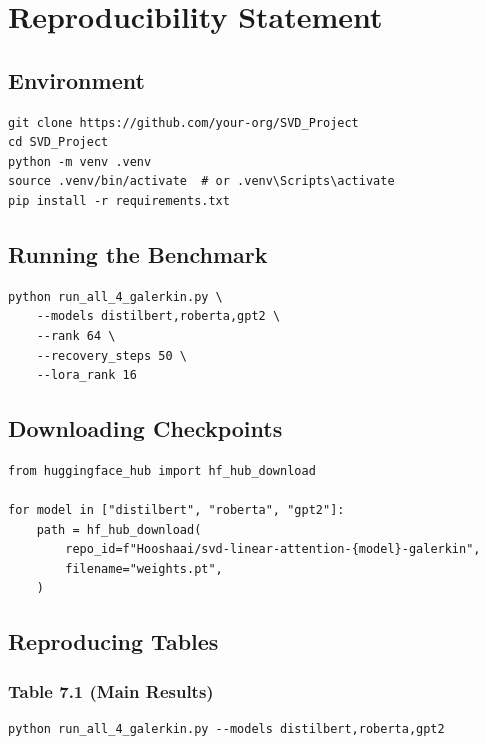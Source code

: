 
\section{Reproducibility Statement}

\subsection{Environment}

\begin{lstlisting}
git clone https://github.com/your-org/SVD_Project
cd SVD_Project
python -m venv .venv
source .venv/bin/activate  # or .venv\Scripts\activate
pip install -r requirements.txt
\end{lstlisting}

\subsection{Running the Benchmark}

\begin{lstlisting}
python run_all_4_galerkin.py \
    --models distilbert,roberta,gpt2 \
    --rank 64 \
    --recovery_steps 50 \
    --lora_rank 16
\end{lstlisting}

\subsection{Downloading Checkpoints}

\begin{lstlisting}
from huggingface_hub import hf_hub_download

for model in ["distilbert", "roberta", "gpt2"]:
    path = hf_hub_download(
        repo_id=f"Hooshaai/svd-linear-attention-{model}-galerkin",
        filename="weights.pt",
    )
\end{lstlisting}

\subsection{Reproducing Tables}

\subsubsection{Table 7.1 (Main Results)}

\begin{lstlisting}
python run_all_4_galerkin.py --models distilbert,roberta,gpt2
\end{lstlisting}

